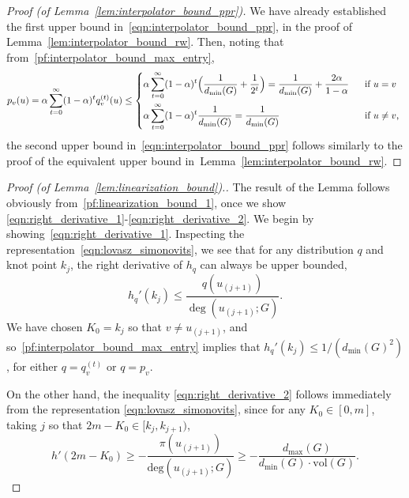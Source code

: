 \documentclass{article}
\newcommand{\vol}{\mathrm{vol}}
\newcommand{\1}{\mathbf{1}}
\theoremstyle{definition}
\theoremstyle{remark}
\begin{document}
\begin{proof}[Proof (of Lemma~\ref{lem:interpolator_bound_ppr})]
	We have already established the first upper bound in~\eqref{eqn:interpolator_bound_ppr}, in the proof of Lemma~\ref{lem:interpolator_bound_rw}. Then, noting that from~\eqref{pf:interpolator_bound_max_entry}, 
	\begin{equation}
	\label{eqn:ppr_max_entry}
	p_v(u) = \alpha \sum_{t = 0}^{\infty} (1 - \alpha)^t q_v^{(t)}(u) \leq
	\begin{dcases*}
	\alpha \sum_{t = 0}^{\infty} (1 - \alpha)^t \Bigl(\frac{1}{d_{\min}(G)} + \frac{1}{2^t}\Bigr) = \frac{1}{d_{\min}(G)} + \frac{2\alpha}{1 - \alpha}& ~~\textrm{if $u = v$} \\
	\alpha \sum_{t = 0}^{\infty} (1 - \alpha)^t \frac{1}{d_{\min}(G)} = \frac{1}{d_{\min}(G)} & ~~\textrm{if $u \neq v$,}
	\end{dcases*}
	\end{equation}
	the second upper bound in~\eqref{eqn:interpolator_bound_ppr} follows similarly to the proof of the equivalent upper bound in~Lemma~\ref{lem:interpolator_bound_rw}.
\end{proof}

\begin{proof}[Proof (of Lemma~\ref{lem:linearization_bound}).]
	The result of the Lemma follows obviously from~\eqref{pf:linearization_bound_1}, once we show \eqref{eqn:right_derivative_1}-\eqref{eqn:right_derivative_2}. We begin by showing~\eqref{eqn:right_derivative_1}. Inspecting the representation~\eqref{eqn:lovasz_simonovits}, we see that for any distribution $q$ and knot point $k_j$, the right derivative of $h_q$ can always be upper bounded,
	\begin{equation*}
	h_{q}'(k_j) \leq \frac{q(u_{(j + 1)})}{\deg(u_{(j + 1)};G)}.
	\end{equation*}
	We have chosen $K_0 = k_j$ so that $v \neq u_{(j + 1)}$, and so~\eqref{pf:interpolator_bound_max_entry} implies that $h_{q}'(k_j) \leq 1/(d_{\min}(G)^2)$, for either $q = q_v^{(t)}$ or $q = p_v$.
	
	On the other hand, the inequality \eqref{eqn:right_derivative_2} follows immediately from the representation \eqref{eqn:lovasz_simonovits}, since for any $K_0 \in [0,m]$, taking $j$ so that $2m - K_0 \in [k_j, k_{j + 1})$, 
	\begin{equation*}
	h'(2m - K_0) \geq -\frac{\pi(u_{(j+1)})}{\mathrm{deg}(u_{(j + 1)};G)} \geq -\frac{d_{\max}(G)}{d_{\min}(G) \cdot \vol(G)}.
	\end{equation*}
\end{proof}
\end{document}
